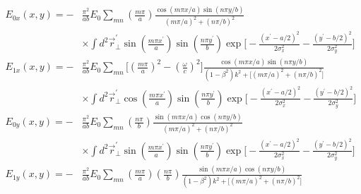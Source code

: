 \documentclass[11pt,oneside]{article}
\begin{document}
\begin{equation}
\begin{split}
  E_{0x} (x,y)
=
- & \frac{\pi^{2}}{ab} E_{0}
    \sum_{mn} \left( \frac{m \pi}{a} \right)
    \frac{ \cos \left( m \pi x /a \right) \sin \left( n \pi y /b \right) }
         { \left( m \pi /a \right)^{2} + \left( n \pi /b \right)^{2} } \\
  & \times
    \int d^{2} \vec{r}_{\perp}^{\prime}
    \sin \left( \frac{ m \pi x^{\prime} }{ a } \right)
    \sin \left( \frac{ n \pi y^{\prime} }{ b } \right)
    \exp \Bigg[
       - \frac{ \left( x^{\prime} - a/2 \right)^{2} }{ 2\sigma_{x}^{2}}
       - \frac{ \left( y^{\prime} - b/2 \right)^{2} }{ 2\sigma_{y}^{2}}
         \Bigg] \\
  E_{1x} (x,y)
=
- & \frac{\pi^{2}}{ab} E_{0}
    \sum_{mn} 
    \Bigg[ \left( \frac{m \pi}{a} \right)^{2} 
         - \left( \frac{\omega}{c} \right)^{2} \Bigg]
    \frac{ \cos \left( m \pi x /a \right) \sin \left( n \pi y /b \right) }
         { \left( 1 - \beta^{2} \right) k^{2}
         + \Big[
           \left( m \pi /a \right)^{2} + \left( n \pi /b \right)^{2}
           \Big] } \\
  & \times
    \int d^{2} \vec{r}_{\perp}^{\prime}
    \cos \left( \frac{ m \pi x^{\prime} }{ a } \right)
    \sin \left( \frac{ n \pi y^{\prime} }{ b } \right)
    \exp \Bigg[
       - \frac{ \left( x^{\prime} - a/2 \right)^{2} }{ 2\sigma_{x}^{2}}
       - \frac{ \left( y^{\prime} - b/2 \right)^{2} }{ 2\sigma_{y}^{2}}
         \Bigg] \\
  E_{0y} (x,y)
=
- & \frac{\pi^{2}}{ab} E_{0}
    \sum_{mn} \left( \frac{n \pi}{b} \right)
    \frac{ \sin \left( m \pi x /a \right) \cos \left( n \pi y /b \right) }
         { \left( m \pi /a \right)^{2} + \left( n \pi /b \right)^{2} } \\
  & \times
    \int d^{2} \vec{r}_{\perp}^{\prime}
    \sin \left( \frac{ m \pi x^{\prime} }{ a } \right)
    \sin \left( \frac{ n \pi y^{\prime} }{ b } \right)
    \exp \Bigg[
       - \frac{ \left( x^{\prime} - a/2 \right)^{2} }{ 2\sigma_{x}^{2}}
       - \frac{ \left( y^{\prime} - b/2 \right)^{2} }{ 2\sigma_{y}^{2}}
         \Bigg] \\
  E_{1y} (x,y)
=
- & \frac{\pi^{2}}{ab} E_{0}
    \sum_{mn} 
    \left( \frac{m \pi}{a} \right)  \left( \frac{n \pi}{b} \right)
    \frac{ \sin \left( m \pi x /a \right) \cos \left( n \pi y /b \right) }
         { \left( 1 - \beta^{2} \right) k^{2}
         + \Big[
           \left( m \pi /a \right)^{2} + \left( n \pi /b \right)^{2}
           \Big] } \\

\end{split}
\end{equation}
\end{document}
